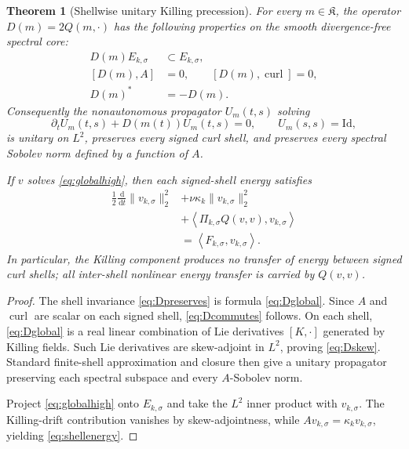 \documentclass[
 aps,
 prd,
 reprint,
 amsmath,
 amssymb,
 nofootinbib,
 superscriptaddress
]{revtex4-2}
\newtheorem{theorem}{Theorem}[section]
\theoremstyle{definition}
\theoremstyle{remark}
\newcommand{\cK}{\mathfrak K}
\newcommand{\curl}{\operatorname{curl}}
\newcommand{\dd}{\,\mathrm d}
\newcommand{\Id}{\mathrm{Id}}
\begin{document}
\begin{theorem}[Shellwise unitary Killing precession]
\label{thm:shellwiseprecession}
For every $m\in\cK$, the operator $D(m)=2Q(m,\cdot)$ has the following
properties on the smooth divergence-free spectral core:
\begin{align}
 D(m)E_{k,\sigma}&\subset E_{k,\sigma},
 \label{eq:Dpreserves}\\
 [D(m),A]&=0,
 \qquad
 [D(m),\curl]=0,
 \label{eq:Dcommutes}\\
 D(m)^*&=-D(m).
 \label{eq:Dskew}
\end{align}
Consequently the nonautonomous propagator $U_m(t,s)$ solving
\[
 \partial_t U_m(t,s)+D(m(t))U_m(t,s)=0,
 \qquad U_m(s,s)=\Id,
\]
is unitary on $L^2$, preserves every signed curl shell, and preserves every
spectral Sobolev norm defined by a function of $A$.

If $v$ solves \eqref{eq:globalhigh}, then each signed-shell energy satisfies
\begin{equation}
\boxed{
\begin{aligned}
 \frac12\frac{\dd}{\dd t}\|v_{k,\sigma}\|_2^2
 &+\nu\kappa_k\|v_{k,\sigma}\|_2^2\\
 &+\left\langle
   \Pi_{k,\sigma}Q(v,v),v_{k,\sigma}
  \right\rangle\\
 &=
 \left\langle F_{k,\sigma},v_{k,\sigma}\right\rangle.
\end{aligned}}
\label{eq:shellenergy}
\end{equation}
In particular, the Killing component produces no transfer of energy between
signed curl shells; all inter-shell nonlinear energy transfer is carried by
$Q(v,v)$.
\end{theorem}

\begin{proof}
The shell invariance \eqref{eq:Dpreserves} is formula \eqref{eq:Dglobal}.
Since $A$ and $\curl$ are scalar on each signed shell, \eqref{eq:Dcommutes}
follows.  On each shell, \eqref{eq:Dglobal} is a real linear combination of
Lie derivatives $[K,\cdot]$ generated by Killing fields.  Such Lie
derivatives are skew-adjoint in $L^2$, proving \eqref{eq:Dskew}.  Standard
finite-shell approximation and closure then give a unitary propagator
preserving each spectral subspace and every $A$-Sobolev norm.

Project \eqref{eq:globalhigh} onto $E_{k,\sigma}$ and take the $L^2$ inner
product with $v_{k,\sigma}$.  The Killing-drift contribution vanishes by
skew-adjointness, while $Av_{k,\sigma}=\kappa_kv_{k,\sigma}$, yielding
\eqref{eq:shellenergy}.
\end{proof}
\end{document}
